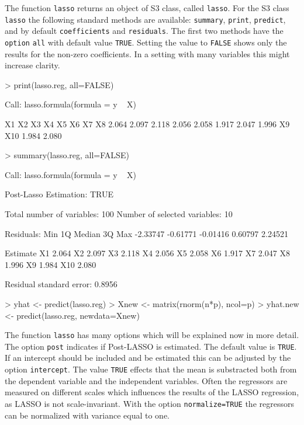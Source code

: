 \documentclass{amsart}
\begin{document}
The function \texttt{lasso} returns an object of S3 class, called \texttt{lasso}. For the S3 class \texttt{lasso} the following standard methods are available: \texttt{summary}, \texttt{print}, \texttt{predict}, and by default \texttt{coefficients} and \texttt{residuals}. The first two methods have the \texttt{option} \texttt{all} with default value \texttt{TRUE}. Setting the value to \texttt{FALSE} shows only the results for the non-zero coefficients. In a setting with many variables this might increase clarity.
\begin{Schunk}
\begin{Sinput}
> print(lasso.reg, all=FALSE)
\end{Sinput}
\begin{Soutput}
Call:
lasso.formula(formula = y ~ X)

   X1     X2     X3     X4     X5     X6     X7     X8  
2.064  2.097  2.118  2.056  2.058  1.917  2.047  1.996  
   X9    X10  
1.984  2.080  
\end{Soutput}
\begin{Sinput}
> summary(lasso.reg, all=FALSE)
\end{Sinput}
\begin{Soutput}
Call:
lasso.formula(formula = y ~ X)

Post-Lasso Estimation:  TRUE 

Total number of variables: 100
Number of selected variables: 10 

Residuals: 
     Min       1Q   Median       3Q      Max 
-2.33747 -0.61771 -0.01416  0.60797  2.24521 

    Estimate
X1     2.064
X2     2.097
X3     2.118
X4     2.056
X5     2.058
X6     1.917
X7     2.047
X8     1.996
X9     1.984
X10    2.080

Residual standard error: 0.8956
\end{Soutput}
\begin{Sinput}
> yhat <- predict(lasso.reg)
> Xnew <- matrix(rnorm(n*p), ncol=p)
> yhat.new <- predict(lasso.reg, newdata=Xnew)
\end{Sinput}
\end{Schunk}

The function \texttt{lasso} has many options which will be explained now in more detail.
The option \texttt{post} indicates if Post-LASSO is estimated. The default value is \texttt{TRUE}. If an intercept should be included and be estimated this can be adjusted by the option \texttt{intercept}. The value \texttt{TRUE} effects that the mean is substracted both from the dependent variable and the independent variables. Often the regressors are measured on different scales which influences the results of the LASSO regression, as LASSO is not scale-invariant. With the option \texttt{normalize=TRUE} the regressors can be normalized with variance equal to one.
\end{document}
